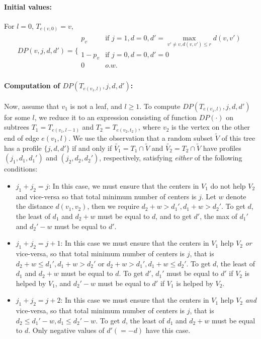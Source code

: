 \documentclass[11pt,onecolumn]{article}
\begin{document}
\paragraph{Initial values: } For $l=0$, $T_{e(v,0)}=v$,
$$
\begin{array}{l} 
DP(v, j, d, d')  = \Bigg\{ \begin{array}{cl}
				p_v & \mbox{if } j=1, d=0, d'=\max_{v'\ne v, d(v,v')\le r} d(v,v') \\
				1-p_v & \mbox{if } j=0, d=0, d'=0\\
				0  & o.w.  	
				\end{array}
\end{array}
$$

\paragraph{Computation of $DP(T_{e(v_1,l)}, j, d, d')$: }
Now, assume that $v_1$ is not a leaf, and $l\ge 1$. 
To compute $DP(T_{e(v_1,l)}, j, d, d')$ for some $l$, we reduce it to an expression consisting of function $DP(\cdot)$ on subtrees $T_1=T_{e(v_1,l-1)}$ and $T_2=T_{e(v_2,t_2)}$, where $v_2$ is the vertex on the other end of edge $e(v_1,l)$. We use the observation that a random subset $\tilde{V}$ 
of this tree has a profile $\{j,d,d'\}$ if and only if $\tilde{V_1} = T_1 \cap \tilde{V}$ 
and  $\tilde{V_2} = T_2 \cap \tilde{V}$ have profiles $(j_1,d_1,d_1')$ and $(j_2,d_2,d_2')$, respectively, satisfying {\it either} of the following conditions:
\begin{itemize}
\item $j_1+j_2=j$: In this case, we must ensure that the centers in $V_1$ do not help $V_2$ and vice-versa so that total 
minimum number of centers is $j$. Let $w$ denote the distance $d(v_1,v_2)$, then we require $d_2+w>d_1', d_1+w>d_2'$. To get $d$, the least of $d_1$ and $d_2+w$ must be equal to 
$d$, and to get $d'$, the max of $d_1'$ and $d_2'-w$ must be equal to $d'$.
\item $j_1+j_2=j+1$: In this case we must ensure that the centers in $V_1$ help $V_2$ {\it or} vice-versa, so that total 
minimum number of centers is $j$, that is $d_2 + w \le d_1', d_1 + w>d_2'$ or $d_2+w>d_1', d_1+w\le d_2'$. To get $d$, the least of 
$d_1$ and $d_2+w$ must be equal to $d$. To get $d'$, $d_1'$ must be equal to $d'$ if $V_2$ is helped by $V_1$, and $d_2'-w$ 
must be equal to $d'$ if $V_1$ is helped by $V_2$.
\item $j_1+j_2=j+2$: In this case we must ensure that the centers in $V_1$ help $V_2$ {\it and} vice-versa, so that total
minimum number of centers is $j$, that is $d_2\le d_1'-w, d_1 \le d_2'-w$. To get $d$, the least of 
$d_1$ and $d_2+w$ must be equal to $d$. Only negative values of $d' (=-d)$ have this case.
\end{itemize}
\end{document}
